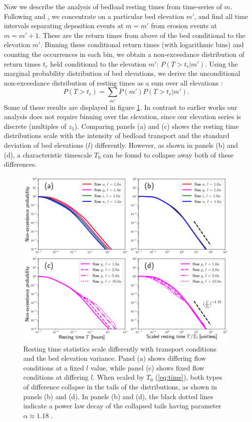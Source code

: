 \documentclass[draft]{agujournal2018}
\newcommand\be{\begin{equation}} %
\newcommand\ee{\end{equation}}   %
\begin{document}
Now we describe the analysis of bedload resting times from time-series of $m$.
Following \citet{Voepel2013} and \citet{Martin2014}, we concentrate on a particular bed elevation $m'$, and find all time intervals separating deposition events at $m=m'$ from erosion events at $m=m'+1$.
These are the return times from above of the bed conditional to the elevation $m'$.
Binning these conditional return times (with logarithmic bins) and counting the occurrences in each bin, we obtain a non-exceedance distribution of return times $t_r$ held conditional to the elevation $m'$: $P(T>t_r|m')$.
Using the marginal probability distribution of bed elevations, we derive the unconditional non-exceedance distribution of resting times as a sum over all elevations \citep{Yang1971, Nakagawa1980, Voepel2013, Martin2014}:
\be P(T>t_r) = \sum_{m'} P(m') P(T>t_r|m') .\ee
Some of these results are displayed in figure \ref{fig:cdfs}.
In contrast to earlier works our analysis does not require binning over the elevation, since our elevation series is discrete (multiples of $z_1$).
Comparing panels (a) and (c) shows the resting time distributions scale with the intensity of bedload transport and the standard deviation of bed elevations ($l$) differently.
However, as shown in panels (b) and (d), a characteristic timescale $T_0$ can be found to collapse away both of these differences.
\begin{figure}[t!]
	\includegraphics[width=\linewidth,keepaspectratio]{./figures/montage1.pdf}
	\caption{Resting time statistics scale differently with transport conditions and the bed elevation variance. Panel (a) shows differing flow conditions at a fixed $l$ value, while panel (c) shows fixed flow conditions at differing $l$. When scaled by $T_0$ (\ref{eq:time}), both types of difference collapse in the tails of the distributions, as shown in panels (b) and (d). In panels (b) and (d), the black dotted lines indicate a power law decay of the collapsed tails having parameter $\alpha\approx1.18$ .}
	\label{fig:cdfs}
\end{figure}
\end{document}

